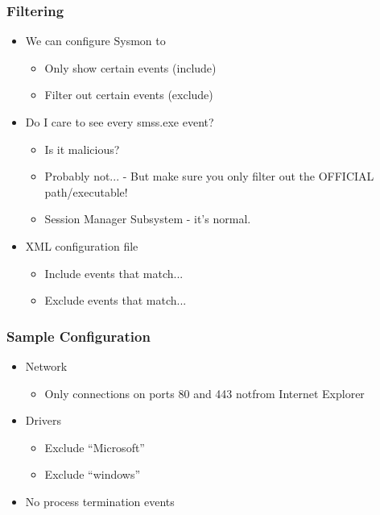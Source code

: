 \subsubsection*{Filtering}
\begin{itemize}
  \item We can configure Sysmon to
  \begin{itemize}
    \item Only show certain events (include)
    \item Filter out certain events (exclude)
  \end{itemize}
  \item Do I care to see every smss.exe event?
  \begin{itemize}
    \item Is it malicious?
    \item Probably not... - But make sure you only filter out the OFFICIAL path/executable!
    \item Session Manager Subsystem - it's normal.
  \end{itemize}
  \item XML configuration file
  \begin{itemize}
    \item Include events that match...
    \item Exclude events that match...
  \end{itemize}
\end{itemize}

\subsubsection*{Sample Configuration}

\begin{itemize}
  \item Network
  \begin{itemize}
    \item Only connections on ports 80 and 443 notfrom Internet Explorer
  \end{itemize}
  \item Drivers
  \begin{itemize}
    \item Exclude “Microsoft”
    \item Exclude “windows”
  \end{itemize}
  \item No process termination events
\end{itemize}


